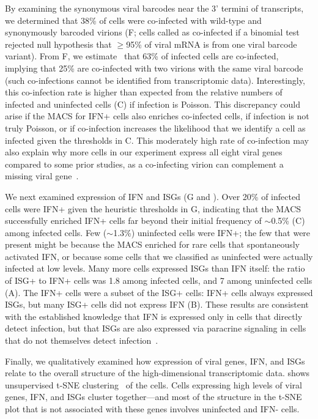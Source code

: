 \documentclass[9pt,lineno]{elife}
\begin{document}
By examining the synonymous viral barcodes near the 3' termini of transcripts, we determined that 38\% of cells were co-infected with wild-type and synonymously barcoded virions (F; cells called as co-infected if a binomial test rejected null hypothesis that $\ge$95\% of viral mRNA is from one viral barcode variant).
From F, we estimate~\citep{bloom2018estimating} that 63\% of infected cells are co-infected, implying that 25\% are co-infected with two virions with the same viral barcode (such co-infections cannot be identified from transcriptomic data).
Interestingly, this co-infection rate is higher than expected from the relative numbers of infected and uninfected cells (C) if infection is Poisson.
This discrepancy could arise if the MACS for IFN+ cells also enriches co-infected cells, if infection is not truly Poisson, or if co-infection increases the likelihood that we identify a cell as infected given the thresholds in C.
This moderately high rate of co-infection may also explain why more cells in our experiment express all eight viral genes compared to some prior studies, as a co-infecting virion can complement a missing viral gene~\citep{russell2018extreme}. 

We next examined expression of IFN and ISGs (G and ).
Over 20\% of  infected cells were IFN+ given the heuristic thresholds in G, indicating that the MACS successfully enriched IFN+ cells far beyond their initial frequency of $\sim$0.5\% (C) among infected cells.
Few ($\sim$1.3\%) uninfected cells were IFN+; the few that were present might be because the MACS enriched for rare cells that spontaneously activated IFN, or because some cells that we classified as uninfected were actually infected at low levels.
Many more cells expressed ISGs than IFN itself: the ratio of ISG+ to IFN+ cells was 1.8 among infected cells, and 7 among uninfected cells (A).
The IFN+ cells were a subset of the ISG+ cells: IFN+ cells always expressed ISGs, but many ISG+ cells did not express IFN (B).
These results are consistent with the established knowledge that IFN is expressed only in cells that directly detect infection, but that ISGs are also expressed via paracrine signaling in cells that do not themselves detect infection~\citep{stetson2006type,honda2006type}.

Finally, we qualitatively examined how expression of viral genes, IFN, and ISGs relate to the overall structure of the high-dimensional transcriptomic data.
 shows unsupervised t-SNE clustering~\citep{maaten2008visualizing} of the cells.
Cells expressing high levels of viral genes, IFN, and ISGs cluster together---and most of the structure in the t-SNE plot that is not associated with these genes involves uninfected and IFN- cells.
\end{document}

